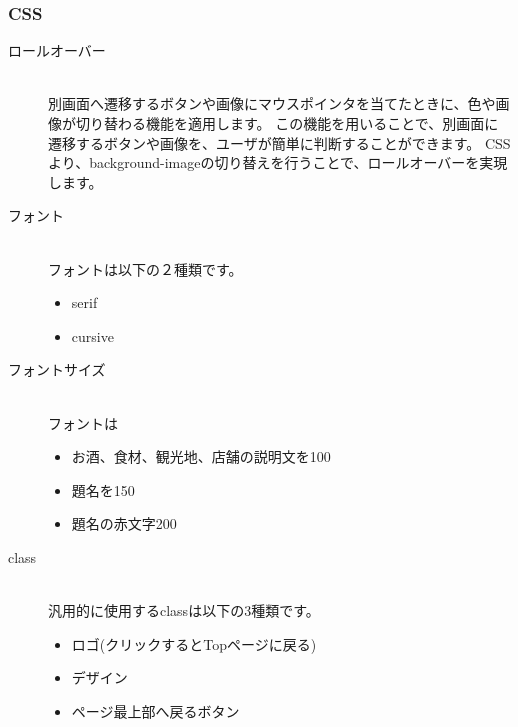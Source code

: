 \documentclass[a4j,titlepage]{jarticle}
\begin{document}
\subsubsection{CSS}
\begin{description}
\item[ロールオーバー]~\\
別画面へ遷移するボタンや画像にマウスポインタを当てたときに、色や画像が切り替わる機能を適用します。
この機能を用いることで、別画面に遷移するボタンや画像を、ユーザが簡単に判断することができます。
CSSより、background-imageの切り替えを行うことで、ロールオーバーを実現します。

\item [フォント]~\\
フォントは以下の２種類です。

\begin{itemize}
\item serif
\item cursive
\end{itemize}

\item [フォントサイズ]~\\
フォントは%

\begin{itemize}
\item お酒、食材、観光地、店舗の説明文を100%
\item 題名を150%
\item 題名の赤文字200%
\end{itemize}


\item [class]~\\
汎用的に使用するclassは以下の3種類です。

\begin{itemize}
\item ロゴ(クリックするとTopページに戻る)
\item デザイン
\item ページ最上部へ戻るボタン
\end{itemize}

\end{description}

\clearpage
\end{document}
